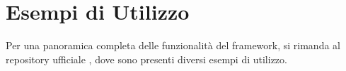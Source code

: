 \section{Esempi di Utilizzo}
Per una panoramica completa delle funzionalità del framework, si rimanda al repository ufficiale \cite{repo}, 
dove sono presenti diversi esempi di utilizzo.